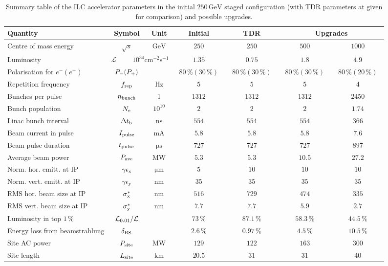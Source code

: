 \begin{table}[tbhp]
\begin{tabular}{lcccccc}
Quantity & Symbol & Unit & Initial & TDR &  \multicolumn{2}{c}{Upgrades} \\
\hline
Centre of mass energy & $\sqrt{s}$ & ${\mathrm{GeV}}$ & $250$ & $250$ & $500$ & $1000$ \\
Luminosity & \multicolumn{2}{c}{${\mathcal{L}}$ ~~~~$10^{34}{\mathrm{cm^{-2}s^{-1}}}$} & $1.35$ & $0.75$ & $1.8$ & $4.9$ \\
Polarisation for $e^- (e^+)$ & $P_{\mathrm{-}} (P_{\mathrm{+}})$ & & ~$80\,\% (30\,\%)$~ &  ~$80\,\% (30\,\%)$~ &  ~$80\,\% (30\,\%)$~ &  ~$80\,\% (20\,\%)$~  \\
Repetition frequency &$f_{\mathrm{{rep}}}$ & ${\mathrm{Hz}}$  & $5$ & $5$ & $5$ & $4$ \\
Bunches per pulse  &$n_{\mathrm{{bunch}}}$ & 1  & $1312$ & $1312$ & $1312$ & $2450$ \\
Bunch population  &$N_{\mathrm{{e}}}$ & $10^{10}$ &$2$ & $2$ & $2$ & $1.74$ \\
Linac bunch interval & $\Delta t_{\mathrm{{b}}}$ & ${\mathrm{ns}}$ & $554$ & $554$ & $554$ & $366$ \\
Beam current in pulse & $I_{\mathrm{{pulse}}}$ & ${\mathrm{mA}}$& $5.8$ & $5.8$ & $5.8$ & $7.6$  \\
Beam pulse duration  & $t_{\mathrm{{pulse}}}$ & ${\mathrm{\mu s}}$ & $727$ & $727$ & $727$ & $897$ \\
Average beam power  & $P_{\mathrm{{ave}}}$   & ${\mathrm{MW}}$ & $5.3$ & $5.3$ & $10.5$  & $27.2$ \\  
Norm. hor. emitt. at IP & $\gamma\epsilon_{\mathrm{{x}}}$ & ${\mathrm{\mu m}}$& $5$ & $10$ & $10$ & $10$  \\ 
Norm. vert. emitt. at IP & $\gamma\epsilon_{\mathrm{{y}}}$ & ${\mathrm{nm}}$ & $35$ & $35$ & $35$ & $35$ \\ 
RMS hor. beam size at IP  & $\sigma^*_{\mathrm{{x}}}$ & ${\mathrm{nm}}$  & $516$ & $729$ & $474$ & $335$ \\
RMS vert. beam size at IP &$\sigma^*_{\mathrm{{y}}}$ & ${\mathrm{nm}}$ & $7.7$  & $7.7$  & $5.9$ & $2.7$ \\
Luminosity in top $1\,\%$ & ${\mathcal{L}}_{\mathrm{0.01}} / {\mathcal{L}}$ &  & $73\,\%$  & $87.1\,\%$  & $58.3\,\%$ & $44.5\,\%$\\
Energy loss from beamstrahlung  & $\delta_{\mathrm{BS}}$ &  & $2.6\,\%$  & $0.97\,\%$  & $4.5\,\%$ & $10.5\,\%$ \\
Site AC power  & $P_{\mathrm{{site}}}$ &  ${\mathrm{MW}}$ & $129$ & $122$ & $163$ & $300$ \\
Site length & $L_{\mathrm{{site}}}$ &  ${\mathrm{km}}$ & $20.5$ & $31$ & $31$ & $40$ \\
\end{tabular}
\caption{Summary table of the ILC accelerator parameters in the initial $250\,{\mathrm{GeV}}$ staged configuration (with TDR parameters at  given for comparison) and possible upgrades.
\label{tab:ilc-params}}
\end{table}

